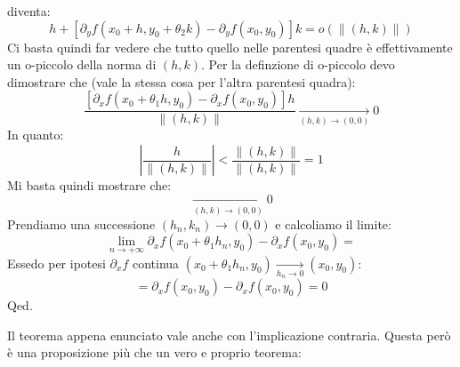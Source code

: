 {	diventa:
	\begin{equation*}
		[\partial_x f(x_0 + \theta_1 h, y_0) - \partial_x f(x_0, y_0) ]h 
		+ [\partial_y f(x_0 + h, y_0 + \theta_2 k) - \partial_y f(x_0, 
		y_0)]k = o(\lVert (h, k) \rVert)
	\end{equation*}
	Ci basta quindi far vedere che tutto quello nelle parentesi quadre è 
	effettivamente un o-piccolo della norma di $(h, k)$. Per la definzione 
	di o-piccolo devo dimostrare che (vale la stessa cosa per l'altra 
	parentesi quadra):
	\begin{equation*}
		\dfrac{[\partial_x f(x_0 + \theta_1 h, y_0) - \partial_x 
		f(x_0, y_0) ]h}{\lVert (h, k) \rVert} \xrightarrow[(h, k) \to 
		(0, 0)] {} 0
	\end{equation*}
	In quanto:
	\begin{equation*}
		\left | \dfrac{h}{\lVert (h, k) \rVert} \right | < \dfrac{\lVert 
		(h, k) \rVert}{\lVert (h, k) \rVert} = 1
	\end{equation*}
	Mi basta quindi mostrare che:
	\begin{equation*}
		[\partial_x f(x_0 + \theta_1 h, y_0) - \partial_x f(x_0, y_0) ] 
		\xrightarrow[(h, k) \to (0, 0)]{} 0
	\end{equation*}
	Prendiamo una successione $(h_n, k_n) \to (0, 0)$ e calcoliamo il 
	limite:
	\begin{equation*}
		\lim_{n \to +\infty} \partial_x f(x_0 + \theta_1 h_n, y_0) - 
		\partial_x f(x_0, y_0) =
	\end{equation*}
	Essedo per ipotesi $\partial_x f$ continua $(x_0 + \theta_1 h_n, y_0) 
	\xrightarrow[h_n \to 0]{} (x_0, y_0)$:
	\begin{equation*}
		= \partial_x f(x_0, y_0) - \partial_x f(x_0, y_0) = 0
	\end{equation*}
	\hfill Qed.
}

Il teorema appena enunciato vale anche con l'implicazione contraria. Questa 
però è una proposizione più che un vero e proprio teorema:

